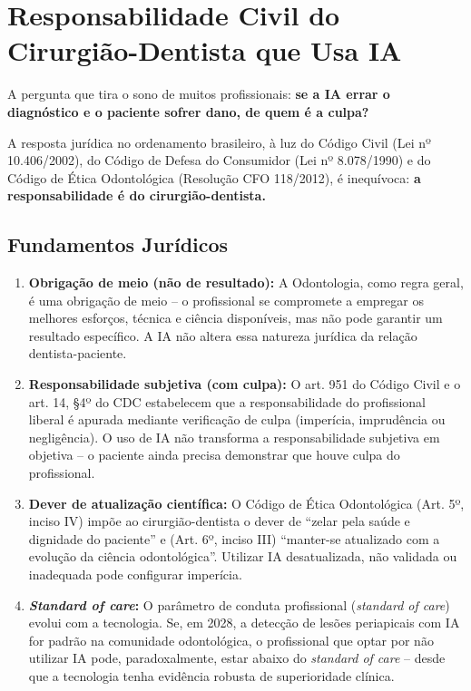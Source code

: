 \section{Responsabilidade Civil do Cirurgião-Dentista que Usa IA}
\label{sec:responsabilidade-civil}

\nivelquatro

A pergunta que tira o sono de muitos profissionais: \textbf{se a IA errar o
diagnóstico e o paciente sofrer dano, de quem é a culpa?}

A resposta jurídica no ordenamento brasileiro, à luz do Código Civil (Lei nº
10.406/2002), do Código de Defesa do Consumidor (Lei nº 8.078/1990) e do
Código de Ética Odontológica (Resolução CFO 118/2012), é inequívoca:
\textbf{a responsabilidade é do cirurgião-dentista.}


\subsection{Fundamentos Jurídicos}

\begin{enumerate}
  \item \textbf{Obrigação de meio (não de resultado):} A Odontologia, como
    regra geral, é uma obrigação de meio -- o profissional se compromete a
    empregar os melhores esforços, técnica e ciência disponíveis, mas não pode
    garantir um resultado específico. A IA não altera essa natureza jurídica da
    relação dentista-paciente.

  \item \textbf{Responsabilidade subjetiva (com culpa):} O art. 951 do Código
    Civil e o art. 14, §4º do CDC estabelecem que a responsabilidade do
    profissional liberal é apurada mediante verificação de culpa (imperícia,
    imprudência ou negligência). O uso de IA não transforma a responsabilidade
    subjetiva em objetiva -- o paciente ainda precisa demonstrar que houve
    culpa do profissional.

  \item \textbf{Dever de atualização científica:} O Código de Ética Odontológica
    (Art. 5º, inciso IV) impõe ao cirurgião-dentista o dever de ``zelar pela
    saúde e dignidade do paciente'' e (Art. 6º, inciso III) ``manter-se
    atualizado com a evolução da ciência odontológica''. Utilizar IA
    desatualizada, não validada ou inadequada pode configurar imperícia.

  \item \textbf{\textit{Standard of care}:} O parâmetro de conduta profissional
    (\textit{standard of care}) evolui com a tecnologia. Se, em 2028, a
    detecção de lesões periapicais com IA for padrão na comunidade odontológica,
    o profissional que optar por não utilizar IA pode, paradoxalmente, estar
    abaixo do \textit{standard of care} -- desde que a tecnologia tenha
    evidência robusta de superioridade clínica.
\end{enumerate}

